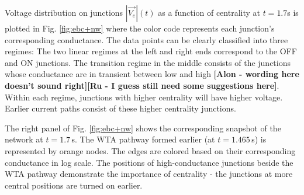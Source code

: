 \documentclass[fleqn,10pt,  amsmath,amssymb,aps]{wlscirep}
\begin{document}



Voltage distribution on junctions $|\vec{V_e}|(t)$ as a function of centrality at $t = 1.7$s is plotted in Fig. \ref{fig:ebc+nw} where the color code represents each junction's corresponding conductance. The data points can be clearly classified into three regimes: The two linear regimes at the left and right ends correspond to the OFF and ON junctions. The transition regime in the middle consists of the junctions whose conductance are in transient between low and high \textbf{[Alon -  wording here doesn't sound right][Ru - I guess still need some suggestions here]}. Within each regime, junctions with higher centrality will have higher voltage. Earlier current paths consist of these higher centrality junctions.

The right panel of Fig. \ref{fig:ebc+nw} shows the corresponding snapshot of the network at $t = 1.7\,$s. The WTA pathway formed earlier (at $t = 1.465 \,$s) is represented by orange nodes. The edges are colored based on their corresponding conductance in log scale. The positions of high-conductance junctions beside the WTA pathway demonstrate the importance of centrality - the junctions at more central positions are turned on earlier.
\end{document}
